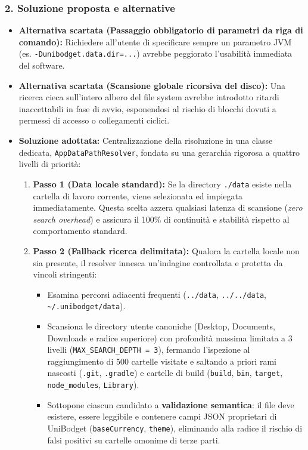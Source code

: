 \documentclass[11pt,a4paper,openright]{report}
\begin{document}
\subsubsection*{2. Soluzione proposta e alternative}
\begin{itemize}
  \item \textbf{Alternativa scartata (Passaggio obbligatorio di parametri da riga di comando):} Richiedere all'utente di specificare sempre un parametro JVM (es. \texttt{-Dunibodget.data.dir=...}) avrebbe peggiorato l'usabilità immediata del software.
  \item \textbf{Alternativa scartata (Scansione globale ricorsiva del disco):} Una ricerca cieca sull'intero albero del file system avrebbe introdotto ritardi inaccettabili in fase di avvio, esponendosi al rischio di blocchi dovuti a permessi di accesso o collegamenti ciclici.
  \item \textbf{Soluzione adottata:} Centralizzazione della risoluzione in una classe dedicata, \texttt{AppDataPathResolver}, fondata su una gerarchia rigorosa a quattro livelli di priorità:
  \begin{enumerate}
    \item \textbf{Passo 1 (Data locale standard):} Se la directory \texttt{./data} esiste nella cartella di lavoro corrente, viene selezionata ed impiegata immediatamente. Questa scelta azzera qualsiasi latenza di scansione (\emph{zero search overhead}) e assicura il 100\% di continuità e stabilità rispetto al comportamento standard.
    \item \textbf{Passo 2 (Fallback ricerca delimitata):} Qualora la cartella locale non sia presente, il resolver innesca un'indagine controllata e protetta da vincoli stringenti:
    \begin{itemize}
      \item Esamina percorsi adiacenti frequenti (\texttt{../data}, \texttt{../../data}, \texttt{\textasciitilde/.unibodget/data}).
      \item Scansiona le directory utente canoniche (Desktop, Documents, Downloads e radice superiore) con profondità massima limitata a 3 livelli (\texttt{MAX\_SEARCH\_DEPTH = 3}), fermando l'ispezione al raggiungimento di 500 cartelle visitate e saltando a priori rami nascosti (\texttt{.git}, \texttt{.gradle}) e cartelle di build (\texttt{build}, \texttt{bin}, \texttt{target}, \texttt{node\_modules}, \texttt{Library}).
      \item Sottopone ciascun candidato a \textbf{validazione semantica}: il file  deve esistere, essere leggibile e contenere campi JSON proprietari di UniBodget (\texttt{baseCurrency}, \texttt{theme}), eliminando alla radice il rischio di falsi positivi su cartelle omonime di terze parti.

\end{itemize}
\end{enumerate}
\end{itemize}
\end{document}
